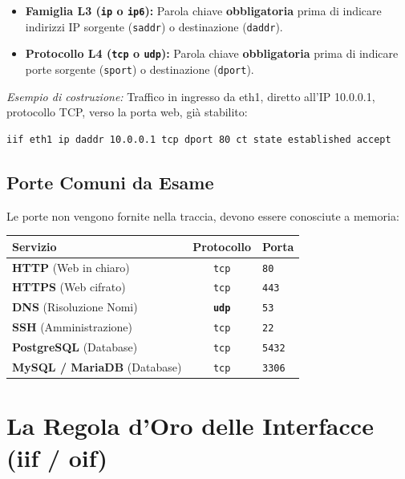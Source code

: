 \documentclass[12pt,a4paper]{report}
\begin{document}
\begin{itemize}
	\item \textbf{Famiglia L3 (\texttt{ip} o \texttt{ip6}):} Parola chiave \textbf{obbligatoria} prima di indicare indirizzi IP sorgente (\texttt{saddr}) o destinazione (\texttt{daddr}).
	\item \textbf{Protocollo L4 (\texttt{tcp} o \texttt{udp}):} Parola chiave \textbf{obbligatoria} prima di indicare porte sorgente (\texttt{sport}) o destinazione (\texttt{dport}).
\end{itemize}

\textit{Esempio di costruzione:} Traffico in ingresso da eth1, diretto all'IP 10.0.0.1, protocollo TCP, verso la porta web, già stabilito:
\begin{lstlisting}[language=bash]
	iif eth1 ip daddr 10.0.0.1 tcp dport 80 ct state established accept
\end{lstlisting}

\subsection{Porte Comuni da Esame}
Le porte non vengono fornite nella traccia, devono essere conosciute a memoria:

\begin{table}[h!]
	\centering
	\begin{tabular}{|l|c|l|}
		\hline
		\textbf{Servizio} & \textbf{Protocollo} & \textbf{Porta} \\ \hline
		\textbf{HTTP} (Web in chiaro) & \texttt{tcp} & \texttt{80} \\ \hline
		\textbf{HTTPS} (Web cifrato) & \texttt{tcp} & \texttt{443} \\ \hline
		\textbf{DNS} (Risoluzione Nomi) & \textbf{\texttt{udp}} & \texttt{53} \\ \hline
		\textbf{SSH} (Amministrazione) & \texttt{tcp} & \texttt{22} \\ \hline
		\textbf{PostgreSQL} (Database) & \texttt{tcp} & \texttt{5432} \\ \hline
		\textbf{MySQL / MariaDB} (Database) & \texttt{tcp} & \texttt{3306} \\ \hline
	\end{tabular}
\end{table}

\section{La Regola d'Oro delle Interfacce (iif / oif)}
\end{document}
